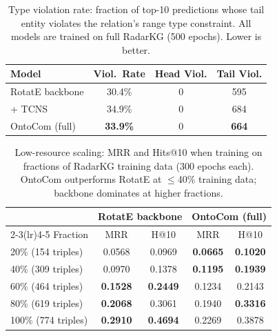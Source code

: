 \begin{table}[h]
\centering
\caption{Type violation rate: fraction of top-10 predictions whose tail entity
violates the relation's range type constraint.
All models are trained on full RadarKG (500 epochs).
Lower is better.}
\label{tab:type_violation}
\begin{tabular}{lccc}
\toprule
Model & Viol.\ Rate & Head Viol. & Tail Viol. \\
\midrule
RotatE backbone & 30.4\% & 0 & 595 \\
\quad + TCNS & 34.9\% & 0 & 684 \\
OntoCom (full) & \textbf{33.9\%} & 0 & \textbf{664} \\
\bottomrule
\end{tabular}
\end{table}

\begin{table}[h]
\centering
\caption{Low-resource scaling: MRR and Hits@10 when training on fractions of
RadarKG training data (300 epochs each). OntoCom outperforms RotatE at
$\leq$40\% training data; backbone dominates at higher fractions.}
\label{tab:scaling}
\begin{tabular}{lcccc}
\toprule
 & \multicolumn{2}{c}{RotatE backbone} & \multicolumn{2}{c}{OntoCom (full)} \\
\cmidrule(lr){2-3}\cmidrule(lr){4-5}
Fraction & MRR & H@10 & MRR & H@10 \\
\midrule
20\% (154 triples) & 0.0568 & 0.0969 & \textbf{0.0665} & \textbf{0.1020} \\
40\% (309 triples) & 0.0970 & 0.1378 & \textbf{0.1195} & \textbf{0.1939} \\
60\% (464 triples) & \textbf{0.1528} & \textbf{0.2449} & 0.1234 & 0.2143 \\
80\% (619 triples) & \textbf{0.2068} & 0.3061 & 0.1940 & \textbf{0.3316} \\
100\% (774 triples) & \textbf{0.2910} & \textbf{0.4694} & 0.2269 & 0.3878 \\
\bottomrule
\end{tabular}
\end{table}

